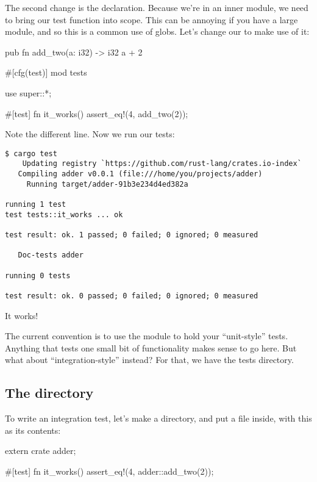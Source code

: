 \blank

The second change is the  declaration. Because we're in an inner module, we need to bring our test function into scope. 
This can be annoying if you have a large module, and so this is a common use of globs. Let's change our  to make 
use of it:

\begin{rustc}
pub fn add_two(a: i32) -> i32 {
    a + 2
}

#[cfg(test)]
mod tests {
    use super::*;

    #[test]
    fn it_works() {
        assert_eq!(4, add_two(2));
    }
}
\end{rustc}

Note the different  line. Now we run our tests:

\begin{verbatim}
$ cargo test
    Updating registry `https://github.com/rust-lang/crates.io-index`
   Compiling adder v0.0.1 (file:///home/you/projects/adder)
     Running target/adder-91b3e234d4ed382a

running 1 test
test tests::it_works ... ok

test result: ok. 1 passed; 0 failed; 0 ignored; 0 measured

   Doc-tests adder

running 0 tests

test result: ok. 0 passed; 0 failed; 0 ignored; 0 measured
\end{verbatim}

It works!

\blank

The current convention is to use the  module to hold your \enquote{unit-style} tests. Anything that tests one 
small bit of functionality makes sense to go here. But what about \enquote{integration-style}  instead? For that, 
we have the tests directory.

\subsection*{The  directory}

To write an integration test, let's make a  directory, and put a  file inside, with this as its contents:

\begin{rustc}
extern crate adder;

#[test]
fn it_works() {
    assert_eq!(4, adder::add_two(2));
}
\end{rustc}

